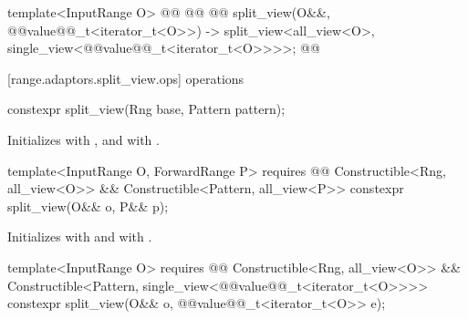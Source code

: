 {\begin{codeblock}
{  template<InputRange O>
    @@
      @@
      @@
  split_view(O&&, @@value@@_t<iterator_t<O>>)
    -> split_view<all_view<O>, single_view<@@value@@_t<iterator_t<O>>>>;
}@\oldtxt{\}}@
\end{codeblock}

[range.adaptors.split_view.ops]{ operations}

%
\begin{itemdecl}
constexpr split_view(Rng base, Pattern pattern);
\end{itemdecl}

\begin{itemdescr}
\pnum
\effects Initializes  with , and
  with .
\end{itemdescr}

%
\begin{itemdecl}
template<InputRange O, ForwardRange P>
  requires @@
    Constructible<Rng, all_view<O>> &&
    Constructible<Pattern, all_view<P>>
constexpr split_view(O&& o, P&& p);
\end{itemdecl}

\begin{itemdescr}
\pnum
\effects
{\color{newclr}
Initializes  with  and
 with .
} %

\end{itemdescr}

%
\begin{itemdecl}
template<InputRange O>
  requires @@
    Constructible<Rng, all_view<O>> &&
    Constructible<Pattern, single_view<@@value@@_t<iterator_t<O>>>>
constexpr split_view(O&& o, @@value@@_t<iterator_t<O>> e);
\end{itemdecl}

}
